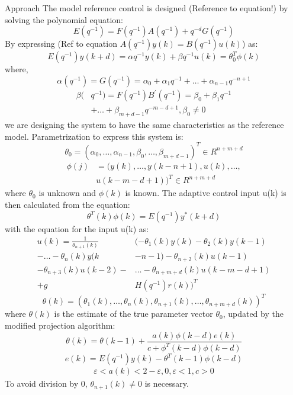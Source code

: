 \begin{section}{Approach}
The model reference control is designed (Reference to equation!) by solving the polynomial equation:
    \begin{equation}
	E(q^{-1})=F(q^{-1})A(q^{-1})+q^{-d}G(q^{-1})
	\end{equation}
By expressing (Ref to equation $A(q^{-1})y(k)=B(q^{-1})u(k)$) as:
	\begin{equation}
	E(q^{-1})y(k+d)={\alpha}q^{-1}y(k) + {\beta}q^{-1}u(k)=\theta_0^T\phi(k)
	\end{equation}
where,
	\begin{equation}
	\alpha(q^{-1})=G(q^{-1})=\alpha_0+\alpha_1q^{-1}+ \dots +\alpha_{n-1}q^{-n+1}
	\end{equation}
	\begin{align}
	\beta( & q^{-1})=F(q^{-1})B^{'}(q^{-1})=\beta_0+\beta_1q^{-1} \nonumber \\
	& + \dots +\beta_{m+d-1}q^{-m-d+1}, \beta_0\neq0
	\end{align}
we are designing the system to have the same characteristics as the reference model. Parametrization to express this system is:
	\begin{equation}
	\theta_0=(\alpha_0, \dots ,\alpha_{n-1},\beta_0, \dots ,\beta_{m+d-1})^T \in R^{n+m+d}
	\end{equation}
	\begin{align}
	\phi(j)&=(y(k), \dots ,y(k-n+1),u(k), \dots , \nonumber \\
	& u(k-m-d+1))^T \in R^{n+m+d}
	\end{align}
where $\theta_0$ is unknown and $\phi(k)$ is known.
	The adaptive control input u(k) is then calculated from the equation:
	\begin{equation}
	\theta^T(k)\phi(k)=E(q^{-1})y^{*}(k+d)
	\end{equation}
with the equation for the input u(k) as:
	\begin{align}
	u(k)=\frac{1}{\theta_{n+1}(k)}&(-\theta_1(k)y(k)-\theta_2(k)y(k-1)  \nonumber \\
    -\dots-\theta_n(k)y(k&-n-1)-\theta_{n+2}(k)u(k-1)  \\
	-\theta_{n+3}(k)u(k-2)-& \dots - \theta_{n+m+d}(k)u(k-m-d+1) \nonumber \\
	+g&H(q^{-1})r(k))^T \nonumber
	\end{align}
	\begin{equation}
	\theta(k)=(\theta_1(k), \dots ,\theta_n(k),\theta_{n+1}(k), \dots ,\theta_{n+m+d}(k))^T
	\end{equation}
where $\theta(k)$ is the estimate of the true parameter vector $\theta_0$, updated by the modified projection algorithm:
	\begin{equation}
	\theta(k)=\theta(k-1)+\frac{a(k)\phi(k-d)e(k)}{c+\phi^T(k-d)\phi(k-d)}
	\end{equation}
	\begin{equation}
	e(k)=E(q^{-1})y(k)-\theta^T(k-1)\phi(k-d)
	\end{equation}
	\begin{align*}
	\varepsilon<a(k)<2-\varepsilon, 0,\varepsilon<1, c>0
	\end{align*}
To avoid division by 0, $\theta_{n+1}(k)\neq0$ is necessary.


\end{section}
